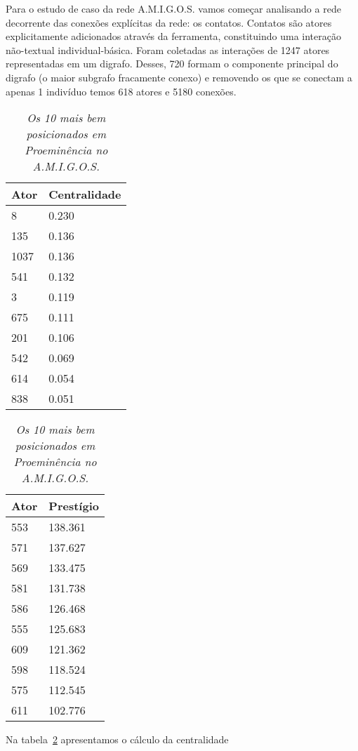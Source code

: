 \documentclass{article}
\begin{document}
\begin{table}[htb]
	\begin{boxedminipage}{\textwidth}
Para o estudo de caso da rede A.M.I.G.O.S. vamos começar analisando a rede
decorrente das conexões explícitas da rede: os contatos. Contatos são atores
explicitamente adicionados através da ferramenta, constituindo uma interação
não-textual individual-básica. Foram coletadas as interações de 1247 atores
representadas em um digrafo. Desses, 720 formam o componente principal do
digrafo (o maior subgrafo fracamente conexo) e removendo os que se conectam a
apenas 1 indivíduo temos 618 atores e 5180 conexões.
		\large       %
		\setlength{\arrayrulewidth}{2\arrayrulewidth}  %
		\setlength{\belowcaptionskip}{10pt}  %
		\caption{\it Os 10 mais bem posicionados em Proeminência no A.M.I.G.O.S.}
		\centering   %
		\begin{tabular}{| l | l |}
			\hline
			Ator & Centralidade \\ \hline
			8 & 0.230 \\
			135 & 0.136 \\
			1037 & 0.136 \\
			541 & 0.132 \\
			3 & 0.119 \\
			675 & 0.111 \\
			201 & 0.106 \\
			542 & 0.069 \\
			614 & 0.054 \\
			838 & 0.051\\
			\hline
		\end{tabular}
		\begin{tabular}{| l | l |}
			\hline
			Ator & Prestígio \\ \hline
			553 & 138.361 \\
			571 & 137.627 \\
			569 & 133.475 \\
			581 & 131.738 \\
			586 & 126.468 \\
			555 & 125.683 \\
			609 & 121.362 \\
			598 & 118.524 \\
			575 & 112.545 \\
			611 & 102.776 \\
			\hline
		\end{tabular}
		\label{tab:acontccent}
\flushleft
Na tabela~\ref{tab:acontccent} apresentamos o cálculo da centralidade

\end{boxedminipage}
\end{table}
\end{document}
